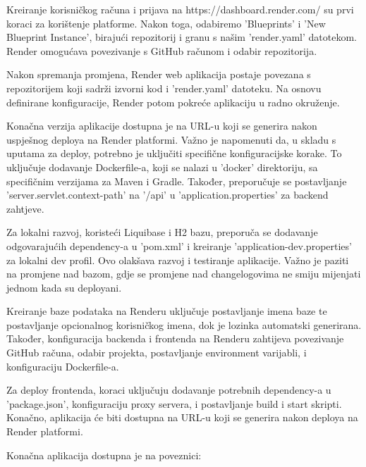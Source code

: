 		Kreiranje korisničkog računa i prijava na https://dashboard.render.com/ su prvi koraci za korištenje platforme. Nakon toga, odabiremo 'Blueprints' i 'New Blueprint Instance', birajući repozitorij i granu s našim 'render.yaml' datotekom. Render omogućava povezivanje s GitHub računom i odabir repozitorija.

		Nakon spremanja promjena, Render web aplikacija postaje povezana s repozitorijem koji sadrži izvorni kod i 'render.yaml' datoteku. Na osnovu definirane konfiguracije, Render potom pokreće aplikaciju u radno okruženje.

		Konačna verzija aplikacije dostupna je na URL-u koji se generira nakon uspješnog deploya na Render platformi. Važno je napomenuti da, u skladu s uputama za deploy, potrebno je uključiti specifične konfiguracijske korake. To uključuje dodavanje Dockerfile-a, koji se nalazi u 'docker' direktoriju, sa specifičnim verzijama za Maven i Gradle. Također, preporučuje se postavljanje 'server.servlet.context-path' na '/api' u 'application.properties' za backend zahtjeve.

		Za lokalni razvoj, koristeći Liquibase i H2 bazu, preporuča se dodavanje odgovarajućih dependency-a u 'pom.xml' i kreiranje 'application-dev.properties' za lokalni dev profil. Ovo olakšava razvoj i testiranje aplikacije. Važno je paziti na promjene nad bazom, gdje se promjene nad changelogovima ne smiju mijenjati jednom kada su deployani.

		Kreiranje baze podataka na Renderu uključuje postavljanje imena baze te postavljanje opcionalnog korisničkog imena, dok je lozinka automatski generirana. Također, konfiguracija backenda i frontenda na Renderu zahtijeva povezivanje GitHub računa, odabir projekta, postavljanje environment varijabli, i konfiguraciju Dockerfile-a.

		Za deploy frontenda, koraci uključuju dodavanje potrebnih dependency-a u 'package.json', konfiguraciju proxy servera, i postavljanje build i start skripti. Konačno, aplikacija će biti dostupna na URL-u koji se generira nakon deploya na Render platformi.

		Konačna aplikacija dostupna je na poveznici:

		\eject